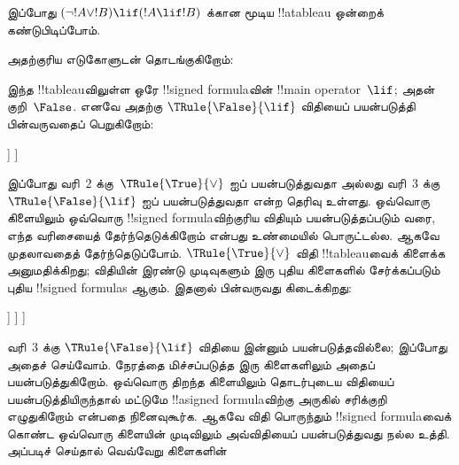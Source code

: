 \documentclass[../../../include/open-logic-section]{subfiles}
\begin{document}
\begin{ex}
இப்போது $(\lnot !A \lor !B) \lif (!A \lif !B)$ க்கான மூடிய !!a{tableau}
ஒன்றைக் கண்டுபிடிப்போம்.

அதற்குரிய எடுகோளுடன் தொடங்குகிறோம்:
\begin{oltableau}
  [\sFmla{\False}{(\lnot \formula{A} \lor \formula{B}) \lif
      (\formula{A} \lif \formula{B})}, just=\TAss]
\end{oltableau}
இந்த !!{tableau}விலுள்ள ஒரே !!{signed formula}வின் !!{main operator}~$\lif$;
அதன் குறி~$\False$. எனவே அதற்கு $\TRule{\False}{\lif}$ விதியைப் பயன்படுத்தி
பின்வருவதைப் பெறுகிறோம்:
\begin{oltableau}
  [\sFmla{\False}{(\lnot \formula{A} \lor \formula{B})
      \lif (\formula{A} \lif \formula{B})}, just=\TAss, checked
    [\sFmla{\True}{\lnot \formula{A} \lor \formula{B}},
      just={\TRule{\False}{\lif}[1]}
      [\sFmla{\False}{(\formula{A} \lif \formula{B})},
        just={\TRule{\False}{\lif}[1]}
      ]
    ]
  ]
\end{oltableau}
இப்போது வரி~$2$ க்கு~$\TRule{\True}{\lor}$ ஐப் பயன்படுத்துவதா அல்லது
வரி~$3$ க்கு $\TRule{\False}{\lif}$ ஐப் பயன்படுத்துவதா என்ற தெரிவு உள்ளது.
ஒவ்வொரு கிளையிலும் ஒவ்வொரு !!{signed formula}விற்குரிய விதியும்
பயன்படுத்தப்படும் வரை, எந்த வரிசையைத் தேர்ந்தெடுக்கிறோம் என்பது உண்மையில்
பொருட்டல்ல. ஆகவே முதலாவதைத் தேர்ந்தெடுப்போம். $\TRule{\True}{\lor}$ விதி
!!{tableau}வைக் கிளைக்க அனுமதிக்கிறது; விதியின் இரண்டு முடிவுகளும் இரு புதிய
கிளைகளில் சேர்க்கப்படும் புதிய !!{signed formula}s ஆகும். இதனால் பின்வருவது
கிடைக்கிறது:
\begin{oltableau}
  [\sFmla{\False}{(\lnot \formula{A} \lor \formula{B}) \lif
      (\formula{A} \lif \formula{B})}, just=\TAss, checked
    [\sFmla{\True}{\lnot \formula{A} \lor \formula{B}},
      just={\TRule{\False}{\lif}[1]}, checked
      [\sFmla{\False}{(\formula{A} \lif \formula{B})},
        just={\TRule{\False}{\lif}[1]}
        [\sFmla{\True}{\lnot \formula{A}}, just={\TRule{\True}{\lor}[2]}]
        [\sFmla{\True}{\formula{B}}, just={\TRule{\True}{\lor}[2]}]
      ]
    ]
  ]
\end{oltableau}
வரி~$3$ க்கு $\TRule{\False}{\lif}$ விதியை இன்னும் பயன்படுத்தவில்லை; இப்போது
அதைச் செய்வோம். நேரத்தை மிச்சப்படுத்த இரு கிளைகளிலும் அதைப் பயன்படுத்துகிறோம்.
ஒவ்வொரு திறந்த கிளையிலும் தொடர்புடைய விதியைப் பயன்படுத்தியிருந்தால் மட்டுமே
!!a{signed formula}விற்கு அருகில் சரிக்குறி எழுதுகிறோம் என்பதை நினைவுகூர்க.
ஆகவே விதி பொருந்தும் !!{signed formula}வைக் கொண்ட ஒவ்வொரு கிளையின் முடிவிலும்
அவ்விதியைப் பயன்படுத்துவது நல்ல உத்தி. அப்படிச் செய்தால் வெவ்வேறு கிளைகளின்

\end{ex}
\end{document}
